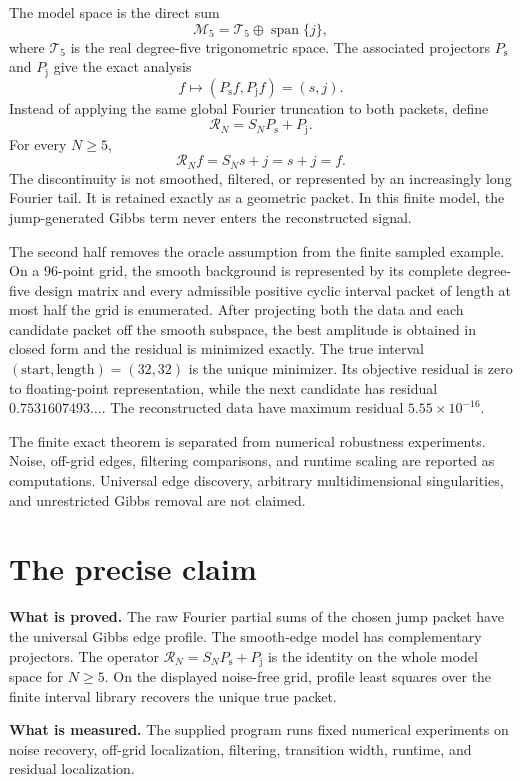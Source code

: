 \documentclass[11pt,oneside]{book}
\theoremstyle{remark}
\newcommand{\Span}{\operatorname{span}}
\newcommand{\SN}{S_N}
\newcommand{\RN}{\mathcal R_N}
\newcommand{\Ps}{P_{\mathrm s}}
\newcommand{\Pj}{P_{\mathrm j}}
\newcommand{\StatusBox}[2]{%
\begin{center}
\colorbox{#1}{\parbox{0.93\linewidth}{\vspace{5pt}\small #2\vspace{5pt}}}
\end{center}}
\begin{document}
The model space is the direct sum
\[
 \mathcal M_5=\mathcal T_5\oplus\Span\{j\},
\]
where $\mathcal T_5$ is the real degree-five trigonometric space. The associated projectors $\Ps$ and $\Pj$ give the exact analysis
\[
 f\longmapsto (\Ps f,\Pj f)=(s,j).
\]
Instead of applying the same global Fourier truncation to both packets, define
\[
 \boxed{\RN=\SN\Ps+\Pj.}
\]
For every $N\ge5$,
\[
 \RN f=\SN s+j=s+j=f.
\]
The discontinuity is not smoothed, filtered, or represented by an increasingly long Fourier tail. It is retained exactly as a geometric packet. In this finite model, the jump-generated Gibbs term never enters the reconstructed signal.

The second half removes the oracle assumption from the finite sampled example. On a $96$-point grid, the smooth background is represented by its complete degree-five design matrix and every admissible positive cyclic interval packet of length at most half the grid is enumerated. After projecting both the data and each candidate packet off the smooth subspace, the best amplitude is obtained in closed form and the residual is minimized exactly. The true interval $(\text{start},\text{length})=(32,32)$ is the unique minimizer. Its objective residual is zero to floating-point representation, while the next candidate has residual $0.7531607493\ldots$. The reconstructed data have maximum residual $5.55\times10^{-16}$.

The finite exact theorem is separated from numerical robustness experiments. Noise, off-grid edges, filtering comparisons, and runtime scaling are reported as computations. Universal edge discovery, arbitrary multidimensional singularities, and unrestricted Gibbs removal are not claimed.

\chapter*{The precise claim}
\StatusBox{PaleTeal}{\textbf{What is proved.} The raw Fourier partial sums of the chosen jump packet have the universal Gibbs edge profile. The smooth-edge model has complementary projectors. The operator $\RN=\SN\Ps+\Pj$ is the identity on the whole model space for $N\ge5$. On the displayed noise-free grid, profile least squares over the finite interval library recovers the unique true packet.}

\StatusBox{PaleOrange}{\textbf{What is measured.} The supplied program runs fixed numerical experiments on noise recovery, off-grid localization, filtering, transition width, runtime, and residual localization.}
\end{document}
